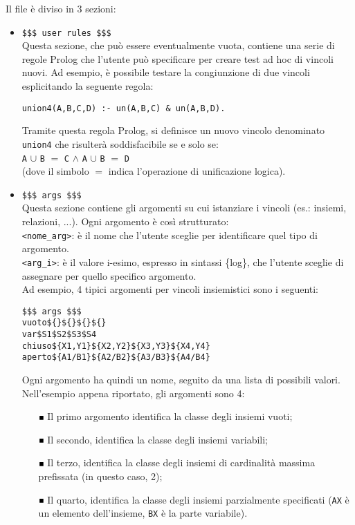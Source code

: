 Il file è diviso in 3 sezioni:
\begin{itemize}

\item \texttt{\$\$\$ user rules \$\$\$} \\
Questa sezione, che può essere eventualmente vuota, contiene una serie di regole Prolog che l'utente può specificare per creare test ad hoc di vincoli nuovi.
Ad esempio, è possibile testare la congiunzione di due vincoli esplicitando la seguente regola:
\begin{verbatim}
union4(A,B,C,D) :- un(A,B,C) & un(A,B,D). 
\end{verbatim}
Tramite questa regola Prolog, si definisce un nuovo vincolo denominato \texttt{union4} che risulterà soddisfacibile se e solo se:\\
\texttt{A} $\cup$ \texttt{B} $=$ \texttt{C} $\wedge$ \texttt{A} $\cup$ \texttt{B} $=$ \texttt{D} \\
(dove il simbolo $=$ indica l'operazione di unificazione logica).\\

\item \texttt{\$\$\$ args \$\$\$} \\
Questa sezione contiene gli argomenti su cui istanziare i vincoli (es.: insiemi, relazioni, ...).
Ogni argomento è così strutturato:\\

\texttt{<nome\_arg>}: è il nome che l'utente sceglie per identificare quel tipo di argomento.\\

\texttt{<arg\_i>}: è il valore i-esimo, espresso in sintassi \{log\}, che l'utente sceglie di assegnare per quello specifico argomento.\\

Ad esempio, 4 tipici argomenti per vincoli insiemistici sono i seguenti:\\

\begin{lstlisting}
$$$ args $$$
vuoto${}${}${}${}
var$S1$S2$S3$S4
chiuso${X1,Y1}${X2,Y2}${X3,Y3}${X4,Y4}
aperto${A1/B1}${A2/B2}${A3/B3}${A4/B4}

\end{lstlisting}

Ogni argomento ha quindi un nome, seguito da una lista di possibili valori.\\
Nell'esempio appena riportato, gli argomenti sono 4:\\

\begin{itemize}
\item [$ \Blacksquare $] Il primo argomento identifica la classe degli insiemi vuoti;
\item [$ \Blacksquare $] Il secondo, identifica la classe degli insiemi variabili;
\item [$ \Blacksquare $] Il terzo, identifica la classe degli insiemi di cardinalità massima prefissata (in questo caso, 2);
\item [$ \Blacksquare $] Il quarto, identifica la classe degli insiemi parzialmente specificati (\texttt{AX} è un elemento dell’insieme, \texttt{BX} è la parte variabile).
\end{itemize}


\end{itemize}
